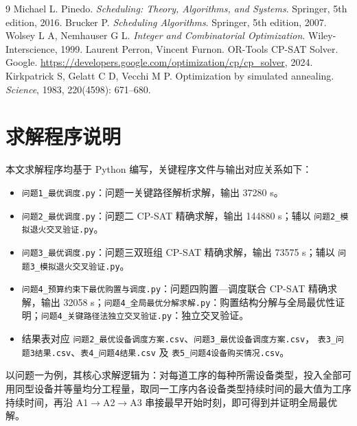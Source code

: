 \documentclass[12pt,a4paper]{article}
\begin{document}
\begin{thebibliography}{9}
Michael L. Pinedo. \textit{Scheduling: Theory, Algorithms, and Systems}. Springer, 5th edition, 2016.
Brucker P. \textit{Scheduling Algorithms}. Springer, 5th edition, 2007.
Wolsey L A, Nemhauser G L. \textit{Integer and Combinatorial Optimization}. Wiley-Interscience, 1999.
Laurent Perron, Vincent Furnon. OR-Tools CP-SAT Solver. Google. \url{https://developers.google.com/optimization/cp/cp_solver}, 2024.
Kirkpatrick S, Gelatt C D, Vecchi M P. Optimization by simulated annealing. \textit{Science}, 1983, 220(4598): 671--680.
\end{thebibliography}

\appendix
\section{求解程序说明}

本文求解程序均基于 Python 编写，关键程序文件与输出对应关系如下：

\begin{itemize}
  \item \texttt{问题1\_最优调度.py}：问题一关键路径解析求解，输出 37280 s。
  \item \texttt{问题2\_最优调度.py}：问题二 CP-SAT 精确求解，输出 144880 s；辅以 \texttt{问题2\_模拟退火交叉验证.py}。
  \item \texttt{问题3\_最优调度.py}：问题三双班组 CP-SAT 精确求解，输出 73575 s；辅以 \texttt{问题3\_模拟退火交叉验证.py}。
  \item \texttt{问题4\_预算约束下最优购置与调度.py}：问题四购置—调度联合 CP-SAT 精确求解，输出 32058 s；\texttt{问题4\_全局最优分解求解.py}：购置结构分解与全局最优性证明；\texttt{问题4\_关键路径法独立交叉验证.py}：独立交叉验证。
  \item 结果表对应 \texttt{问题2\_最优设备调度方案.csv}、\texttt{问题3\_最优设备调度方案.csv}，\newline
        \texttt{表3\_问题3结果.csv}、\texttt{表4\_问题4结果.csv} 及 \texttt{表5\_问题4设备购买情况.csv}。
\end{itemize}

以问题一为例，其核心求解逻辑为：对每道工序的每种所需设备类型，投入全部可用同型设备并等量均分工程量，取同一工序内各设备类型持续时间的最大值为工序持续时间，再沿 A1$\to$A2$\to$A3 串接最早开始时刻，即可得到并证明全局最优解。
\end{document}
